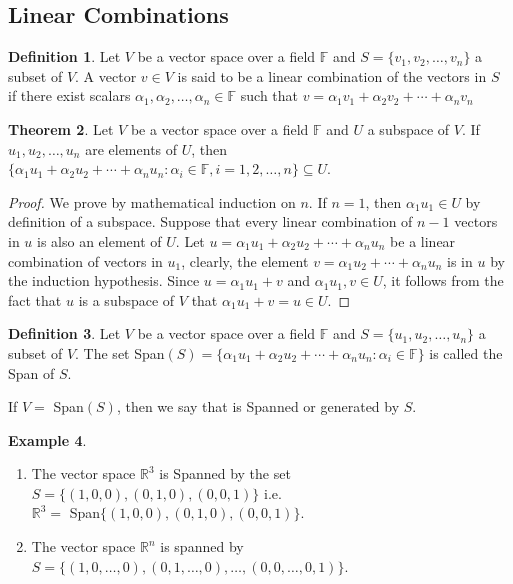 \documentclass[11pt,a4paper]{article}
\theoremstyle{definition}
\newtheorem{thm}{Theorem}[subsection]
\newtheorem{defn}[thm]{Definition}
\newtheorem{exa}[thm]{Example}
\begin{document}
\subsection{Linear Combinations}


\begin{defn}
Let $V$ be a vector space over a field $\mathbb{F}$ and $S=\{v_1,v_2,\dots,v_n\}$ a subset of $V$. A vector $v\in V$ is said to be a linear combination of the vectors in $S$ if there exist scalars $\alpha_1, \alpha_2,\dots,\alpha_n\in \mathbb{F}$ such that $v=\alpha_1v_1+\alpha_2v_2+\cdots+\alpha_nv_n$
\end{defn}


\begin{thm}
Let $V$ be a vector space over a field $\mathbb{F}$ and $U$ a subspace of $V$. If $u_1,u_2,\dots,u_n$ are elements of $U$, then $\{\alpha_1 u_1+\alpha_2 u_2+\cdots+\alpha_nu_n:\alpha_i\in \mathbb{F}, i=1,2,\dots,n\}\subseteq U$.
\end{thm}


\begin{proof}
We prove by mathematical induction on $n$. If $n=1$, then $\alpha_1u_1\in U$ by definition of a subspace. Suppose that every linear combination of $n-1$ vectors in $u$ is also an element of $U$. Let $u=\alpha_1u_1+\alpha_2u_2+\cdots+\alpha_nu_n$ be a linear combination of vectors in $u_1$, clearly, the element  $v=\alpha_1u_2+\cdots+\alpha_nu_n$ is in $u$ by the induction hypothesis. Since $u=\alpha_1u_1+v$ and $\alpha_1u_1,v\in U$, it follows from the fact that $u$ is a subspace of $V$ that $\alpha_1u_1+v=u\in U.$
\end{proof}

\begin{defn}
Let $V$ be a vector space over a field $\mathbb{F}$ and $S=\{u_1,u_2,\dots,u_n\}$ a subset of $V$. The set Span$(S)=\{\alpha_1u_1+\alpha_2u_2+\cdots+\alpha_nu_n: \alpha_i\in \mathbb{F}\}$ is called the Span of $S$.

If $V=$ Span$(S)$, then we say that is Spanned or generated by $S$.
\end{defn}
\begin{exa}
\begin{enumerate}
\item The vector space $\mathbb{R}^3$ is Spanned by the set $S=\{(1,0,0), (0,1,0), (0,0,1)\}$ i.e. \\$\mathbb{R}^3=$ Span$\{(1,0,0), (0,1,0), (0,0,1)\}$.
\item The vector space $\mathbb{R}^n$ is spanned by $S=\{(1,0,\dots,0), (0,1,\dots,0),\dots, (0,0,\dots,0,1)\}$.
\end{enumerate}
\end{exa}
\end{document}
